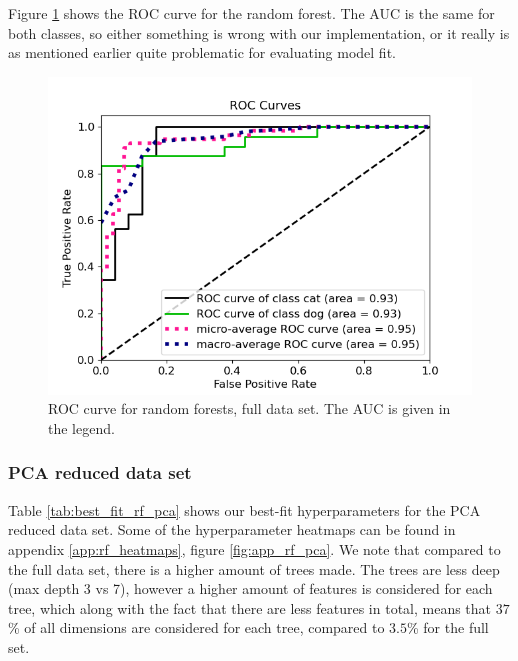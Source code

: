 \documentclass[a4paper]{article}
\begin{document}
Figure \ref{fig:rf_roc_nonpca} shows the ROC curve for the random forest. The AUC is the same for both classes, so either something is wrong with our implementation, or it really is as mentioned earlier quite problematic for evaluating model fit.
\begin{figure}[H]
	\centering
	\includegraphics[scale=0.5]{../figures/random_forest/roc_nbins200_pca0_seed4155_ts0.20.png}
	\caption{ROC curve for random forests, full data set. The AUC is given in the legend.}
	\label{fig:rf_roc_nonpca}
\end{figure}	

\subsubsection{PCA reduced data set}
Table \ref{tab:best_fit_rf_pca} shows our best-fit hyperparameters for the PCA reduced data set. Some of the hyperparameter heatmaps can be found in appendix \ref{app:rf_heatmaps}, figure \ref{fig:app_rf_pca}. We note that compared to the full data set, there is a higher amount of trees made. The trees are less deep (max depth 3 vs 7), however a higher amount of features is considered for each tree, which along with the fact that there are less features in total, means that $37$\% of all dimensions are considered for each tree, compared to $3.5$\% for the full set.
\end{document}
